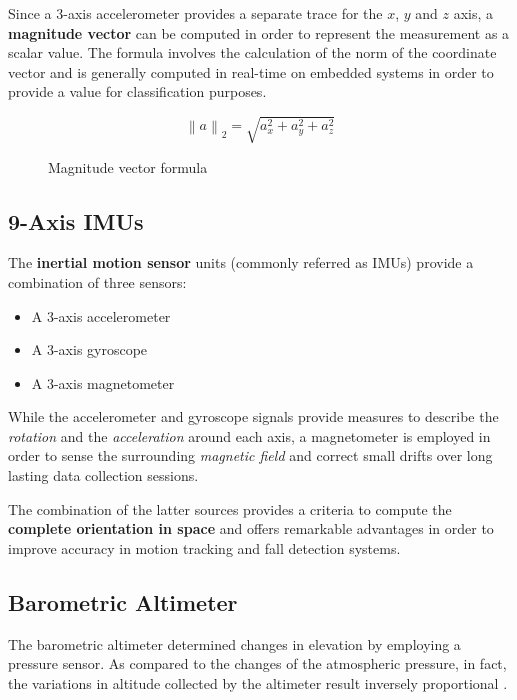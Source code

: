 Since a 3-axis accelerometer provides a separate trace for the $x$, $y$ and $z$ axis, a \textbf{magnitude vector} can be computed in order to represent the measurement as a scalar value. The formula involves the calculation of the norm of the coordinate vector and is generally computed in real-time on embedded systems in order to provide a value for classification purposes.

\newcommand\norm[1]{\left\lVert#1\right\rVert}

\begin{figure}[h]
    \begin{equation}
    \norm{a}_2 = \sqrt{a_{x}^2 + a_{y}^2 + a_{z}^2}
    \end{equation}
    \caption{Magnitude vector formula}
    \label{fig:magnitude}
\end{figure}

\subsection{9-Axis IMUs}\label{subsec:imus}

The \textbf{inertial motion sensor} units (commonly referred as IMUs) provide a combination of three sensors:

\begin{itemize}
    \item A 3-axis accelerometer
    \item A 3-axis gyroscope 
    \item A 3-axis magnetometer 
\end{itemize}

While the accelerometer and gyroscope signals provide measures to describe the \emph{rotation} and the \emph{acceleration} around each axis, a magnetometer is employed in order to sense the surrounding \emph{magnetic field} and correct small drifts over long lasting data collection sessions.

The combination of the latter sources provides a criteria to compute the \textbf{complete orientation in space} and offers remarkable advantages in order to improve accuracy in motion tracking and fall detection systems.

\subsection{Barometric Altimeter}\label{subsec:altimeter}

The barometric altimeter determined changes in elevation by employing a pressure sensor. As compared to the changes of the atmospheric pressure, in fact, the variations in altitude collected by the altimeter result inversely proportional \cite{mems-altimeter}.

